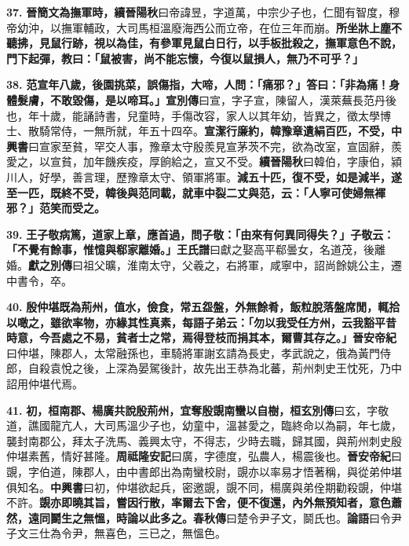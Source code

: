 \textbf{37.} \textbf{晉簡文為撫軍時，}{\footnotesize \textbf{續晉陽秋}曰帝諱昱，字道萬，中宗少子也，仁聞有智度，穆帝幼沖，以撫軍輔政，大司馬桓溫廢海西公而立帝，在位三年而崩。}\textbf{所坐牀上塵不聽拂，見鼠行跡，視以為佳，有參軍見鼠白日行，以手板批殺之，撫軍意色不說，門下起彈，教曰：「鼠被害，尚不能忘懷，今復以鼠損人，無乃不可乎？」}

\textbf{38.} \textbf{范宣年八歲，後園挑菜，誤傷指，大啼，人問：「痛邪？」答曰：「非為痛！身體髮膚，不敢毀傷，是以啼耳。」}{\footnotesize \textbf{宣別傳}曰宣，字子宣，陳留人，漢萊蕪長范丹後也，年十歲，能誦詩書，兒童時，手傷改容，家人以其年幼，皆異之，徵太學博士、散騎常侍，一無所就，年五十四卒。}\textbf{宣潔行廉約，韓豫章遺絹百匹，不受，}{\footnotesize \textbf{中興書}曰宣家至貧，罕交人事，豫章太守殷羨見宣茅茨不完，欲為改室，宣固辭，羨愛之，以宣貧，加年饑疾疫，厚餉給之，宣又不受。\textbf{續晉陽秋}曰韓伯，字康伯，潁川人，好學，善言理，歷豫章太守、領軍將軍。}\textbf{減五十匹，復不受，如是減半，遂至一匹，既終不受，韓後與范同載，就車中裂二丈與范，云：「人寧可使婦無褌邪？」范笑而受之。}

\textbf{39.} \textbf{王子敬病篤，道家上章，應首過，問子敬：「由來有何異同得失？」子敬云：「不覺有餘事，惟憶與郗家離婚。」}{\footnotesize \textbf{王氏譜}曰獻之娶高平郗曇女，名道茂，後離婚。\textbf{獻之別傳}曰祖父曠，淮南太守，父羲之，右將軍，咸寧中，詔尚餘姚公主，遷中書令，卒。}

\textbf{40.} \textbf{殷仲堪既為荊州，值水，儉食，常五盌盤，外無餘肴，飯粒脫落盤席閒，輒拾以噉之，雖欲率物，亦緣其性真素，每語子弟云：「勿以我受任方州，云我豁平昔時意，今吾處之不易，貧者士之常，焉得登枝而捐其本，爾曹其存之。」}{\footnotesize \textbf{晉安帝紀}曰仲堪，陳郡人，太常融孫也，車騎將軍謝玄請為長史，孝武說之，俄為黃門侍郎，自殺袁悅之後，上深為晏駕後計，故先出王恭為北蕃，荊州刺史王忱死，乃中詔用仲堪代焉。}

\textbf{41.} \textbf{初，桓南郡、楊廣共說殷荊州，宜奪殷覬南蠻以自樹，}{\footnotesize \textbf{桓玄別傳}曰玄，字敬道，譙國龍亢人，大司馬溫少子也，幼童中，溫甚愛之，臨終命以為嗣，年七歲，襲封南郡公，拜太子洗馬、義興太守，不得志，少時去職，歸其國，與荊州刺史殷仲堪素舊，情好甚隆。\textbf{周祗隆安記}曰廣，字德度，弘農人，楊震後也。\textbf{晉安帝紀}曰覬，字伯道，陳郡人，由中書郎出為南蠻校尉，覬亦以率易才悟著稱，與從弟仲堪俱知名。\textbf{中興書}曰初，仲堪欲起兵，密邀覬，覬不同，楊廣與弟佺期勸殺覬，仲堪不許。}\textbf{覬亦即曉其旨，嘗因行散，率爾去下舍，便不復還，內外無預知者，意色蕭然，遠同鬬生之無慍，時論以此多之。}{\footnotesize \textbf{春秋傳}曰楚令尹子文，鬬氏也。\textbf{論語}曰令尹子文三仕為令尹，無喜色，三已之，無慍色。}

